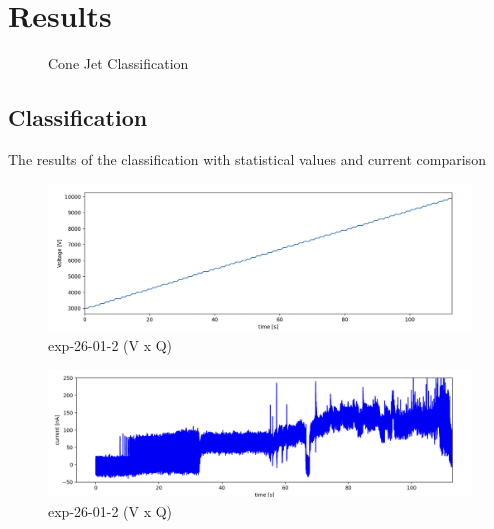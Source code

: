 \chapter{Results}
\label{chap:Results}

\begin{figure}[H]
    \centering
    \caption{Cone Jet Classification}
    \label{fig:multi_class_exp}
\end{figure}


\section{Classification}
\label{sec:classification_results}

The results of the classification with statistical values and current comparison


\begin{figure}[H]
    \center
    \includegraphics[width=12cm]{Figuras/19:03/voltage_step.png}
    \caption{ exp-26-01-2 (V x Q)}
\end{figure}


\begin{figure}[H]
    \center
    \includegraphics[width=12cm]{Figuras/19:03/raw-data-example.png}
    \caption{ exp-26-01-2 (V x Q)}
\end{figure}


